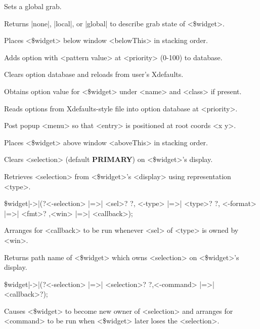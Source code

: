 \begin{enum}{1cm}
Sets a global grab.

Returns |none|, |local|, or |global| to describe grab state of <\$widget>.

Places <\$widget> below window <belowThis> in stacking order.

Adds option with <pattern value> at <priority> (0-100) to database.

Clears option database and reloads from user's Xdefaults.

Obtains option value for <\$widget> under <name> and <class> if present.

Reads options from Xdefaults-style file into option database at <priority>.

Post popup <menu> so that <entry> is positioned at root coords <x y>.

Places <\$widget> above window <aboveThis> in stacking order.

Clears <selection> (default {\bf PRIMARY}) on <\$widget>'s display.

Retrieves <selection> from <\$widget>'s <display> using representation <type>.

\item[\$widget|->|\kwd{selectionHandle}(?<-selection> |=>| <sel>? ?, <-type> |=>| <type>?]
  ?, <-format> |=>| <fmt>? ,<win> |=>| <callback>);\strut\newline
Arranges for <callback> to be run whenever <sel> of <type> is owned by <win>.

Returns path name of <\$widget> which owns <selection> on <\$widget>'s display.

\item[\$widget|->|\kwd{selectionOwn}(?<-selection> |=>| <selection>?]
  ?,<-command> |=>| <callback>?);\strut\newline
Causes <\$widget> to become new owner of <selection> and arranges for
<command> to be run when <\$widget> later loses the <selection>.


\end{enum}
